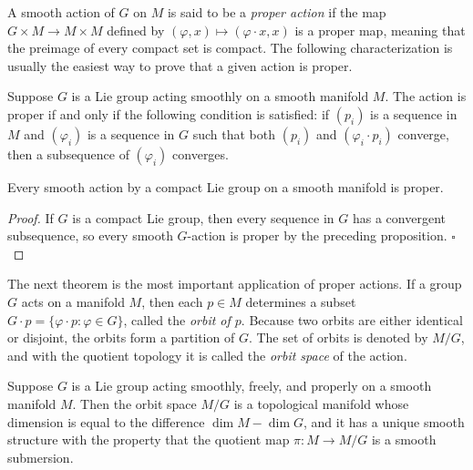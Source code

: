 A smooth action of $G$ on $M$ is said to be a \textit{proper action} if the map $G \times M \to M \times M$ defined by $(\varphi, x) \mapsto (\varphi \cdot x, x)$ is a proper map, meaning that the preimage of every compact set is compact. The following characterization is usually the easiest way to prove that a given action is proper.

\begin{proposition}[]\label{prop:proper-action-condition}
Suppose $G$ is a Lie group acting smoothly on a smooth manifold $M$. The action is proper if and only if the following condition is satisfied: if $(p_i)$ is a sequence in $M$ and $(\varphi_i)$ is a sequence in $G$ such that both $(p_i)$ and $(\varphi_i \cdot p_i)$ converge, then a subsequence of $(\varphi_i)$ converges.
\end{proposition}

\begin{corollary}[]\label{cor:compact-lie-group-actions-proper}
Every smooth action by a compact Lie group on a smooth manifold is proper.
\end{corollary}

\begin{proof}
If $G$ is a compact Lie group, then every sequence in $G$ has a convergent subsequence, so every smooth $G$-action is proper by the preceding proposition. $\square$
\end{proof}

The next theorem is the most important application of proper actions. If a group $G$ acts on a manifold $M$, then each $p \in M$ determines a subset $G \cdot p = \{\varphi \cdot p : \varphi \in G\}$, called the \textit{orbit of $p$}. Because two orbits are either identical or disjoint, the orbits form a partition of $G$. The set of orbits is denoted by $M/G$, and with the quotient topology it is called the \textit{orbit space} of the action.

\begin{theorem}\label{thm:quotient-manifold-theorem}
Suppose $G$ is a Lie group acting smoothly, freely, and properly on a smooth manifold $M$. Then the orbit space $M/G$ is a topological manifold whose dimension is equal to the difference $\dim M - \dim G$, and it has a unique smooth structure with the property that the quotient map $\pi: M \to M/G$ is a smooth submersion.
\end{theorem}


